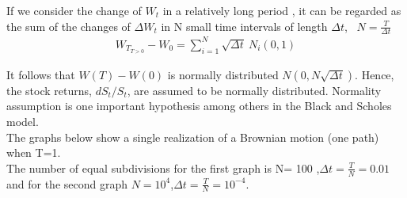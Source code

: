\documentclass[12pt]{report}
\begin{document}
If we consider the change of $W_t$ in a relatively long period , it can be regarded as the sum of the changes of $\Delta W_t$ in N small time intervals of length $\Delta t$,~ $N=\frac{T}{\Delta t}$
 \begin{gather}
W_{T_{T>0}} -W_0= \sum\limits_{i=1}^N \sqrt{\Delta t}~ N_i(0,1)
\label{broawnian}  
 \end{gather}

  It follows that $W(T)-W(0)$ is normally distributed $N(0,N\sqrt{\Delta t})$.  Hence, the stock returns, $dS_t/S_t$, are assumed to be normally distributed. Normality assumption is one important hypothesis among others in the Black and Scholes model.\\

The graphs below show a single realization of a Brownian motion (one path) when T=1.\\
The number of equal subdivisions for the first graph is N= 100 ,$\Delta t=\frac{T}{N}=0.01$ and for the second graph $N=10^4$,$\Delta t=\frac{T}{N}=10^{-4}$.
\end{document}
